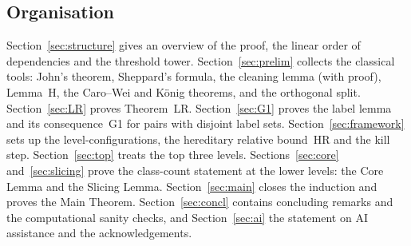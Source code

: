 \subsection{Organisation}
Section~\ref{sec:structure} gives an overview of the proof, the linear order of dependencies and the threshold
tower. Section~\ref{sec:prelim} collects the classical tools: John's theorem, Sheppard's formula, the
cleaning lemma (with proof), Lemma~H, the Caro--Wei and K\"onig theorems, and the orthogonal split. Section~\ref{sec:LR}
proves Theorem~LR. Section~\ref{sec:G1} proves the label lemma and its consequence~G1 for pairs with disjoint label
sets. Section~\ref{sec:framework} sets up the level-configurations, the hereditary relative bound~HR and the kill
step. Section~\ref{sec:top} treats the top three levels. Sections~\ref{sec:core} and~\ref{sec:slicing} prove the
class-count statement at the lower levels: the Core Lemma and the Slicing Lemma. Section~\ref{sec:main} closes the
induction and proves the Main Theorem. Section~\ref{sec:concl} contains concluding remarks and the computational
sanity checks, and Section~\ref{sec:ai} the statement on AI assistance and the acknowledgements.
